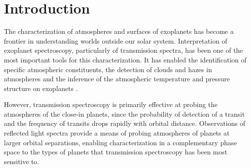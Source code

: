 \documentclass[12pt, letterpaper]{aastex631}
\begin{document}

\section{Introduction} \label{sec:intro}

The characterization of atmospheres and surfaces of exoplanets has become a frontier in understanding worlds outside our solar system.  Interpretation of exoplanet spectroscopy, particularly of transmission spectra, has been one of the most important tools for this characterization.  It has enabled the identification of specific atmospheric constituents, the detection of clouds and hazes in atmospheres and the inference of the atmospheric temperature and pressure structure on exoplanets \citep{2008ApJ...673L..87R, 2014Natur.505...66K, 2016Natur.537...69D}.  


However, transmission spectroscopy is primarily effective at probing the atmospheres of the close-in planets, since the probability of detection of a transit \citep{2013PASP..125..933S} and the frequency of transits drops rapidly with orbital distance. Observations of reflected light spectra provide a means of probing atmospheres of planets at larger orbital separations, enabling characterization in a complementary phase space to the types of planets that transmission spectroscopy has been most sensitive to. 
\end{document}
